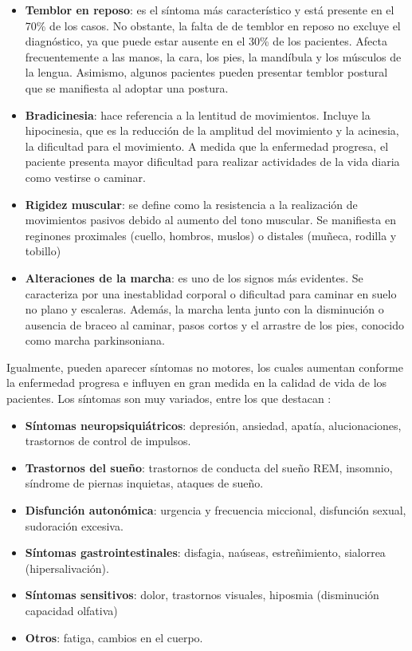 \begin{itemize}
    \item \textbf{Temblor en reposo}: es el síntoma más característico y está presente en el 70\% de los casos. No obstante, la falta de de temblor en reposo no excluye el diagnóstico, ya que puede estar ausente en el 30\% de los pacientes. Afecta frecuentemente a las manos, la cara, los pies, la mandíbula y los músculos de la lengua. Asimismo, algunos pacientes pueden presentar temblor postural que se manifiesta al adoptar una postura.
    \item \textbf{Bradicinesia}: hace referencia a la lentitud de movimientos. Incluye la hipocinesia, que es la reducción de la amplitud del movimiento y la acinesia, la dificultad para el movimiento. A medida que la enfermedad progresa, el paciente presenta mayor dificultad para realizar actividades de la vida diaria como vestirse o caminar.
    \item \textbf{Rigidez muscular}: se define como la resistencia a la realización de movimientos pasivos debido al aumento del tono muscular. Se manifiesta en reginones proximales (cuello, hombros, muslos) o distales (muñeca, rodilla y tobillo)
    \item \textbf{Alteraciones de la marcha}: es uno de los signos más evidentes. Se caracteriza por una inestablidad corporal o dificultad para caminar en suelo no plano y escaleras. Además, la marcha lenta junto con la disminución o ausencia de braceo al caminar, pasos cortos y el arrastre de los pies, conocido como marcha parkinsoniana.
\end{itemize}

Igualmente, pueden aparecer síntomas no motores, los cuales aumentan conforme la enfermedad progresa e influyen en gran medida en la calidad de vida de los pacientes. Los síntomas son muy variados, entre los que destacan \cite{MARTINEZFERNANDEZ2016363}:
\begin{itemize}
    \item \textbf{Síntomas neuropsiquiátricos}: depresión, ansiedad, apatía, alucionaciones, trastornos de control de impulsos.
    \item \textbf{Trastornos del sueño}: trastornos de conducta del sueño REM, insomnio, síndrome de piernas inquietas, ataques de sueño.
    \item \textbf{Disfunción autonómica}: urgencia y frecuencia miccional, disfunción sexual, sudoración excesiva.
    \item \textbf{Síntomas gastrointestinales}: disfagia, naúseas, estreñimiento, sialorrea (hipersalivación).
    \item \textbf{Síntomas sensitivos}: dolor, trastornos visuales, hiposmia (disminución capacidad olfativa)
    \item \textbf{Otros}: fatiga, cambios en el cuerpo.
\end{itemize}


